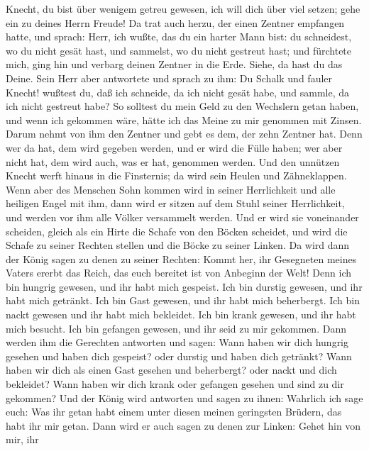 Knecht, du bist über wenigem getreu gewesen, ich will dich über viel
setzen; gehe ein zu deines Herrn Freude!  Da trat auch
herzu, der einen Zentner empfangen hatte, und sprach: Herr, ich wußte,
das du ein harter Mann bist: du schneidest, wo du nicht gesät hast, und
sammelst, wo du nicht gestreut hast;  und fürchtete mich,
ging hin und verbarg deinen Zentner in die Erde. Siehe, da hast du das
Deine.  Sein Herr aber antwortete und sprach zu ihm: Du
Schalk und fauler Knecht! wußtest du, daß ich schneide, da ich nicht
gesät habe, und sammle, da ich nicht gestreut habe?  So
solltest du mein Geld zu den Wechslern getan haben, und wenn ich
gekommen wäre, hätte ich das Meine zu mir genommen mit Zinsen.
 Darum nehmt von ihm den Zentner und gebt es dem, der zehn
Zentner hat.  Denn wer da hat, dem wird gegeben werden, und
er wird die Fülle haben; wer aber nicht hat, dem wird auch, was er hat,
genommen werden.  Und den unnützen Knecht werft hinaus in
die Finsternis; da wird sein Heulen und Zähneklappen.  Wenn
aber des Menschen Sohn kommen wird in seiner Herrlichkeit und alle
heiligen Engel mit ihm, dann wird er sitzen auf dem Stuhl seiner
Herrlichkeit,  und werden vor ihm alle Völker versammelt
werden. Und er wird sie voneinander scheiden, gleich als ein Hirte die
Schafe von den Böcken scheidet,  und wird die Schafe zu
seiner Rechten stellen und die Böcke zu seiner Linken.  Da
wird dann der König sagen zu denen zu seiner Rechten: Kommt her, ihr
Gesegneten meines Vaters ererbt das Reich, das euch bereitet ist von
Anbeginn der Welt!  Denn ich bin hungrig gewesen, und ihr
habt mich gespeist. Ich bin durstig gewesen, und ihr habt mich getränkt.
Ich bin Gast gewesen, und ihr habt mich beherbergt.  Ich
bin nackt gewesen und ihr habt mich bekleidet. Ich bin krank gewesen,
und ihr habt mich besucht. Ich bin gefangen gewesen, und ihr seid zu mir
gekommen.  Dann werden ihm die Gerechten antworten und
sagen: Wann haben wir dich hungrig gesehen und haben dich gespeist? oder
durstig und haben dich getränkt?  Wann haben wir dich als
einen Gast gesehen und beherbergt? oder nackt und dich bekleidet?
 Wann haben wir dich krank oder gefangen gesehen und sind
zu dir gekommen?  Und der König wird antworten und sagen zu
ihnen: Wahrlich ich sage euch: Was ihr getan habt einem unter diesen
meinen geringsten Brüdern, das habt ihr mir getan.  Dann
wird er auch sagen zu denen zur Linken: Gehet hin von mir, ihr
